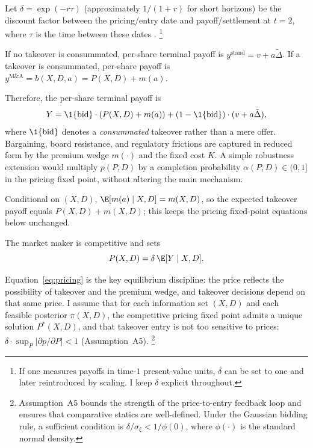 Let $\delta = \exp(-r\tau)$ (approximately $1/(1+r)$ for short horizons) be the discount factor between the pricing/entry date and payoff/settlement at $t=2$, where $\tau$ is the time between these dates \citep{Cochrane2005,Duffie2010}.%
\footnote{If one measures payoffs in time-$1$ present-value units, $\delta$ can be set to one and later reintroduced by scaling. I keep $\delta$ explicit throughout.}

If no takeover is consummated, per-share terminal payoff is $y^{\text{stand}} = v + a\tilde{\Delta}$. If a takeover is consummated, per-share payoff is $y^{\text{M\&A}} = b(X,D,a) = P(X,D) + m(a)$.

Therefore, the per-share terminal payoff is
\[
Y = \1\{\textup{bid}\} \cdot (P(X,D) + m(a)) + (1 - \1\{\textup{bid}\}) \cdot (v + a\tilde{\Delta}),
\]
where $\1\{\textup{bid}\}$ denotes a \emph{consummated} takeover rather than a mere offer. Bargaining, board resistance, and regulatory frictions are captured in reduced form by the premium wedge $m(\cdot)$ and the fixed cost $K$. A simple robustness extension would multiply $p(P,D)$ by a completion probability $\alpha(P,D)\in(0,1]$ in the pricing fixed point, without altering the main mechanism.

Conditional on $(X,D)$, $\E[m(a) \mid X,D]=m(X,D)$, so the expected takeover payoff equals $P(X,D)+m(X,D)$; this keeps the pricing fixed-point equations below unchanged.

The market maker is competitive and sets
\begin{equation}
P(X,D) = \delta \, \E[Y \mid X, D].
\label{eq:pricing}
\end{equation}

Equation~\eqref{eq:pricing} is the key equilibrium discipline: the price reflects the possibility of takeover and the premium wedge, and takeover decisions depend on that same price. I assume that for each information set $(X,D)$ and each feasible posterior $\pi(X,D)$, the competitive pricing fixed point admits a unique solution $P^*(X,D)$, and that takeover entry is not too sensitive to prices: $\delta\cdot\sup_P|\partial p/\partial P|<1$ (Assumption~A5).%
\footnote{Assumption~A5 bounds the strength of the price-to-entry feedback loop and ensures that comparative statics are well-defined. Under the Gaussian bidding rule, a sufficient condition is $\delta/\sigma_\xi < 1/\phi(0)$, where $\phi(\cdot)$ is the standard normal density.}

